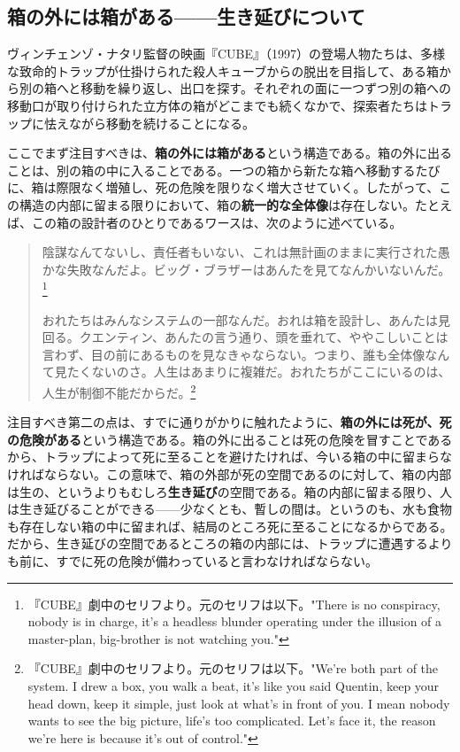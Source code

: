 \documentclass[9pt,b5j,twoside,twocolumn]{utarticle}
\begin{document}
\subsection{\tbaselineshift =3.0pt 箱の外には箱がある------生き延びについて}

ヴィンチェンゾ・ナタリ監督の映画『CUBE』（1997）の登場人物たちは、多様な致命的トラップが仕掛けられた殺人キューブからの脱出を目指して、ある箱から別の箱へと移動を繰り返し、出口を探す。それぞれの面に一つずつ別の箱への移動口が取り付けられた立方体の箱がどこまでも続くなかで、探索者たちはトラップに怯えながら移動を続けることになる。

ここでまず注目すべきは、\textbf{箱の外には箱がある}という構造である。箱の外に出ることは、別の箱の中に入ることである。一つの箱から新たな箱へ移動するたびに、箱は際限なく増殖し、死の危険を限りなく増大させていく。したがって、この構造の内部に留まる限りにおいて、箱の\textbf{統一的な全体像}は存在しない。たとえば、この箱の設計者のひとりであるワースは、次のように述べている。

\begin{quotation}
陰謀なんてないし、責任者もいない、これは無計画のままに実行された愚かな失敗なんだよ。ビッグ・ブラザーはあんたを見てなんかいないんだ。\footnote{『CUBE』劇中のセリフより。元のセリフは以下。"There is no conspiracy, nobody is in charge, it's a headless blunder operating under the illusion of a master-plan, big-brother is not watching you."}

おれたちはみんなシステムの一部なんだ。おれは箱を設計し、あんたは見回る。クエンティン、あんたの言う通り、頭を垂れて、ややこしいことは言わず、目の前にあるものを見なきゃならない。つまり、誰も全体像なんて見たくないのさ。人生はあまりに複雑だ。おれたちがここにいるのは、人生が制御不能だからだ。\footnote{『CUBE』劇中のセリフより。元のセリフは以下。"We're both part of the system. I drew a box, you walk a beat, it's like you said Quentin, keep your head down, keep it simple, just look at what's in front of you. I mean nobody wants to see the big picture, life's too complicated. Let's face it, the reason we're here is because it's out of control."}
\end{quotation}

注目すべき第二の点は、すでに通りがかりに触れたように、\textbf{箱の外には死が、死の危険がある}という構造である。箱の外に出ることは死の危険を冒すことであるから、トラップによって死に至ることを避けたければ、今いる箱の中に留まらなければならない。この意味で、箱の外部が死の空間であるのに対して、箱の内部は生の、というよりもむしろ\textbf{生き延び}の空間である。箱の内部に留まる限り、人は生き延びることができる------少なくとも、暫しの間は。というのも、水も食物も存在しない箱の中に留まれば、結局のところ死に至ることになるからである。だから、生き延びの空間であるところの箱の内部には、トラップに遭遇するよりも前に、すでに死の危険が備わっていると言わなければならない。
\end{document}
